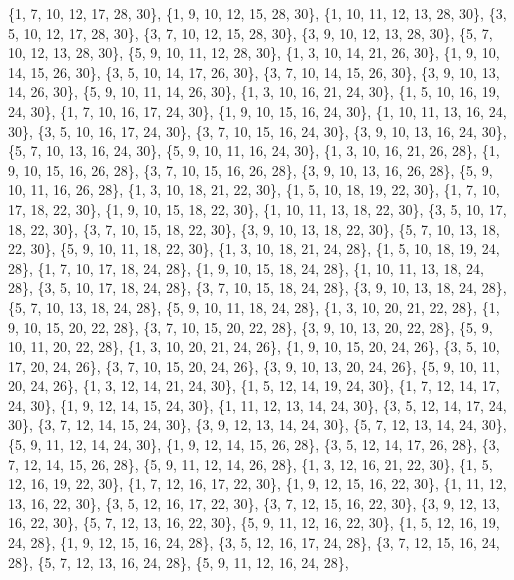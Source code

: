 \documentclass[11pt,a4paper]{article}
\begin{document}
{\{1, 7, 10, 12, 17, 28, 30\}, \{1, 9, 10, 12, 15, 28, 30\}, \{1, 10, 11, 12, 13, 28, 30\}, \{3, 5, 10, 12, 17, 28, 30\}, \{3, 7, 10, 12, 15, 28, 30\},
\{3, 9, 10, 12, 13, 28, 30\}, \{5, 7, 10, 12, 13, 28, 30\}, \{5, 9, 10, 11, 12, 28, 30\}, \{1, 3, 10, 14, 21, 26, 30\}, \{1, 9, 10, 14, 15, 26, 30\},
\{3, 5, 10, 14, 17, 26, 30\}, \{3, 7, 10, 14, 15, 26, 30\}, \{3, 9, 10, 13, 14, 26, 30\}, \{5, 9, 10, 11, 14, 26, 30\}, \{1, 3, 10, 16, 21, 24, 30\},
\{1, 5, 10, 16, 19, 24, 30\}, \{1, 7, 10, 16, 17, 24, 30\}, \{1, 9, 10, 15, 16, 24, 30\}, \{1, 10, 11, 13, 16, 24, 30\}, \{3, 5, 10, 16, 17, 24, 30\},
\{3, 7, 10, 15, 16, 24, 30\}, \{3, 9, 10, 13, 16, 24, 30\}, \{5, 7, 10, 13, 16, 24, 30\}, \{5, 9, 10, 11, 16, 24, 30\}, \{1, 3, 10, 16, 21, 26, 28\},
\{1, 9, 10, 15, 16, 26, 28\}, \{3, 7, 10, 15, 16, 26, 28\}, \{3, 9, 10, 13, 16, 26, 28\}, \{5, 9, 10, 11, 16, 26, 28\}, \{1, 3, 10, 18, 21, 22, 30\},
\{1, 5, 10, 18, 19, 22, 30\}, \{1, 7, 10, 17, 18, 22, 30\}, \{1, 9, 10, 15, 18, 22, 30\}, \{1, 10, 11, 13, 18, 22, 30\}, \{3, 5, 10, 17, 18, 22, 30\},
\{3, 7, 10, 15, 18, 22, 30\}, \{3, 9, 10, 13, 18, 22, 30\}, \{5, 7, 10, 13, 18, 22, 30\}, \{5, 9, 10, 11, 18, 22, 30\}, \{1, 3, 10, 18, 21, 24, 28\},
\{1, 5, 10, 18, 19, 24, 28\}, \{1, 7, 10, 17, 18, 24, 28\}, \{1, 9, 10, 15, 18, 24, 28\}, \{1, 10, 11, 13, 18, 24, 28\}, \{3, 5, 10, 17, 18, 24, 28\},
\{3, 7, 10, 15, 18, 24, 28\}, \{3, 9, 10, 13, 18, 24, 28\}, \{5, 7, 10, 13, 18, 24, 28\}, \{5, 9, 10, 11, 18, 24, 28\}, \{1, 3, 10, 20, 21, 22, 28\},
\{1, 9, 10, 15, 20, 22, 28\}, \{3, 7, 10, 15, 20, 22, 28\}, \{3, 9, 10, 13, 20, 22, 28\}, \{5, 9, 10, 11, 20, 22, 28\}, \{1, 3, 10, 20, 21, 24, 26\},
\{1, 9, 10, 15, 20, 24, 26\}, \{3, 5, 10, 17, 20, 24, 26\}, \{3, 7, 10, 15, 20, 24, 26\}, \{3, 9, 10, 13, 20, 24, 26\}, \{5, 9, 10, 11, 20, 24, 26\},
\{1, 3, 12, 14, 21, 24, 30\}, \{1, 5, 12, 14, 19, 24, 30\}, \{1, 7, 12, 14, 17, 24, 30\}, \{1, 9, 12, 14, 15, 24, 30\}, \{1, 11, 12, 13, 14, 24, 30\},
\{3, 5, 12, 14, 17, 24, 30\}, \{3, 7, 12, 14, 15, 24, 30\}, \{3, 9, 12, 13, 14, 24, 30\}, \{5, 7, 12, 13, 14, 24, 30\}, \{5, 9, 11, 12, 14, 24, 30\},
\{1, 9, 12, 14, 15, 26, 28\}, \{3, 5, 12, 14, 17, 26, 28\}, \{3, 7, 12, 14, 15, 26, 28\}, \{5, 9, 11, 12, 14, 26, 28\}, \{1, 3, 12, 16, 21, 22, 30\},
\{1, 5, 12, 16, 19, 22, 30\}, \{1, 7, 12, 16, 17, 22, 30\}, \{1, 9, 12, 15, 16, 22, 30\}, \{1, 11, 12, 13, 16, 22, 30\}, \{3, 5, 12, 16, 17, 22, 30\},
\{3, 7, 12, 15, 16, 22, 30\}, \{3, 9, 12, 13, 16, 22, 30\}, \{5, 7, 12, 13, 16, 22, 30\}, \{5, 9, 11, 12, 16, 22, 30\}, \{1, 5, 12, 16, 19, 24, 28\},
\{1, 9, 12, 15, 16, 24, 28\}, \{3, 5, 12, 16, 17, 24, 28\}, \{3, 7, 12, 15, 16, 24, 28\}, \{5, 7, 12, 13, 16, 24, 28\}, \{5, 9, 11, 12, 16, 24, 28\},
}
\end{document}
